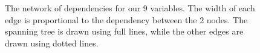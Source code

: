 \documentclass[11pt,a4paper,oneside]{report}
\begin{document}
\begin{figure}
\begin{tikzpicture}[scale=1.5,auto,swap]
  
\end{tikzpicture}
\caption{The network of dependencies for our 9 variables. The width of each
edge is proportional to the dependency between the 2 nodes. The spanning tree
is drawn using full lines, while the other edges are drawn using dotted lines.}
\end{figure}
\end{document}
